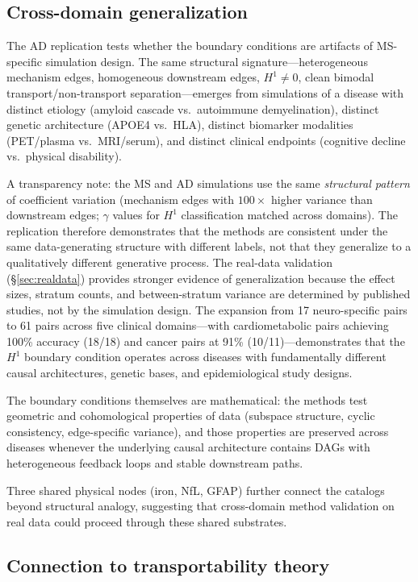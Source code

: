 \documentclass{article}
\begin{document}
\subsection{Cross-domain generalization}

The AD replication tests whether the boundary conditions are artifacts of MS-specific simulation design.
The same structural signature---heterogeneous mechanism edges, homogeneous downstream edges, $H^1 \neq 0$, clean bimodal transport/non-transport separation---emerges from simulations of a disease with distinct etiology (amyloid cascade vs.\ autoimmune demyelination), distinct genetic architecture (APOE4 vs.\ HLA), distinct biomarker modalities (PET/plasma vs.\ MRI/serum), and distinct clinical endpoints (cognitive decline vs.\ physical disability).

A transparency note: the MS and AD simulations use the same \emph{structural pattern} of coefficient variation (mechanism edges with $100\times$ higher variance than downstream edges; $\gamma$ values for $H^1$ classification matched across domains).
The replication therefore demonstrates that the methods are consistent under the same data-generating structure with different labels, not that they generalize to a qualitatively different generative process.
The real-data validation (\S\ref{sec:realdata}) provides stronger evidence of generalization because the effect sizes, stratum counts, and between-stratum variance are determined by published studies, not by the simulation design.
The expansion from 17 neuro-specific pairs to 61 pairs across five clinical domains---with cardiometabolic pairs achieving 100\% accuracy (18/18) and cancer pairs at 91\% (10/11)---demonstrates that the $H^1$ boundary condition operates across diseases with fundamentally different causal architectures, genetic bases, and epidemiological study designs.

The boundary conditions themselves are mathematical: the methods test geometric and cohomological properties of data (subspace structure, cyclic consistency, edge-specific variance), and those properties are preserved across diseases whenever the underlying causal architecture contains DAGs with heterogeneous feedback loops and stable downstream paths.

Three shared physical nodes (iron, NfL, GFAP) further connect the catalogs beyond structural analogy, suggesting that cross-domain method validation on real data could proceed through these shared substrates.

\subsection{Connection to transportability theory}
\end{document}
